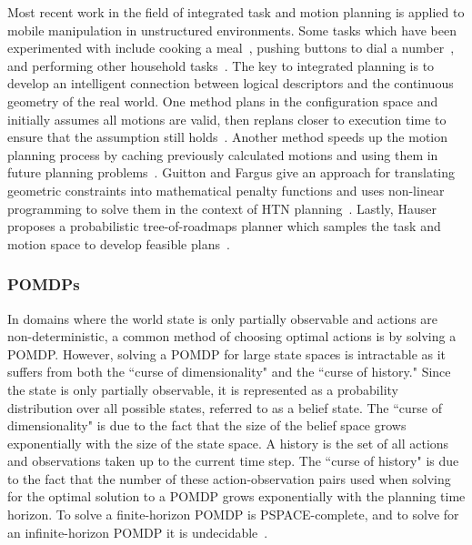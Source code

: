 \documentclass[12pt]{article}
\begin{document}
Most recent work in the field of integrated task and motion planning is applied to mobile manipulation in unstructured environments. Some tasks which have been experimented with include cooking a meal~\cite{beetz2011robotic}, pushing buttons to dial a number~\cite{choi2009combining}, and performing other household tasks~\cite{kaelbling2010hierarchical}. The key to integrated planning is to develop an intelligent connection between logical descriptors and the continuous geometry of the real world. One method plans in the configuration space and initially assumes all motions are valid, then replans closer to execution time to ensure that the assumption still holds~\cite{cambon2009hybrid}. Another method speeds up the motion planning process by caching previously calculated motions and using them in future planning problems~\cite{wolfe2010combined}. Guitton and Fargus give an approach for translating geometric constraints into mathematical penalty functions and uses non-linear programming to solve them in the context of HTN planning~\cite{guitton2009taking}. Lastly, Hauser proposes a probabilistic tree-of-roadmaps planner which samples the task and motion space to develop feasible plans~\cite{hauser2010task}.

\subsubsection{POMDPs} \label{POMDP}

In domains where the world state is only partially observable and actions are non-deterministic, a common method of choosing optimal actions is by solving a POMDP. However, solving a POMDP for large state spaces is intractable as it suffers from both the ``curse of dimensionality" and the ``curse of history." Since the state is only partially observable, it is represented as a probability distribution over all possible states, referred to as a belief state. The ``curse of dimensionality" is due to the fact that the size of the belief space grows exponentially with the size of the state space. A history is the set of all actions and observations taken up to the current time step. The ``curse of history" is due to the fact that the number of these action-observation pairs used when solving for the optimal solution to a POMDP grows exponentially with the planning time horizon. To solve a finite-horizon POMDP is PSPACE-complete, and to solve for an infinite-horizon POMDP it is undecidable~\cite{ross_online_2008}. 
\end{document}
